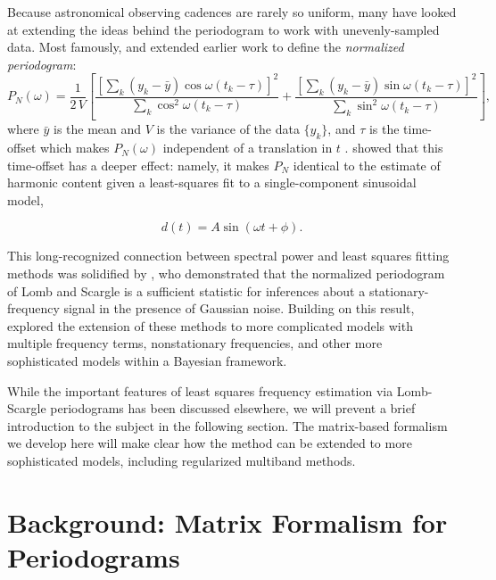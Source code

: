 \documentclass[12pt,preprint]{aastex}
\newcommand{\eqlabel}[1]{\label{eq:#1}}
\begin{document}
Because astronomical observing cadences are rarely so uniform, many have looked at extending the ideas behind the periodogram to work with unevenly-sampled data. Most famously, \citet{Lomb76} and \citet{Scargle82} extended earlier work to define the {\it normalized periodogram}:
\begin{equation}
  \eqlabel{LombScargle}
  P_N(\omega) = \frac{1}{2\,V}\left[
    \frac{\left[\sum_k(y_k - \bar{y})\cos\omega(t_k - \tau)\right]^2}
    {\sum_k \cos^2\omega(t_k - \tau)}
    +
    \frac{\left[\sum_k(y_k - \bar{y})\sin\omega(t_k - \tau)\right]^2}
    {\sum_k \sin^2\omega(t_k - \tau)}
\right],
\end{equation}
where $\bar{y}$ is the mean and $V$ is the variance of the data $\{y_k\}$, and $\tau$ is the time-offset which makes $P_N(\omega)$ independent of a translation in $t$ \citep[see][for an in-depth discussion]{NumRec}. \citet{Lomb76} showed that this time-offset has a deeper effect: namely, it makes $P_N$ identical to the estimate of harmonic content given a least-squares fit to a single-component sinusoidal model,

\begin{equation}
  \eqlabel{SingleModel}
  d(t) = A\sin(\omega t + \phi).
\end{equation}

This long-recognized connection between spectral power and least squares fitting methods was solidified by \citet{Jaynes87}, who demonstrated that the normalized periodogram of Lomb and Scargle is a sufficient statistic for inferences about a stationary-frequency signal in the presence of Gaussian noise. Building on this result, \citet{Bretthorst88} explored the extension of these methods to more complicated models with multiple frequency terms, nonstationary frequencies, and other more sophisticated models within a Bayesian framework.

While the important features of least squares frequency estimation via Lomb-Scargle periodograms has been discussed elsewhere, we will prevent a brief introduction to the subject in the following section.
The matrix-based formalism we develop here will make clear how the method can be extended to more sophisticated models, including regularized multiband methods.


\section{Background: Matrix Formalism for Periodograms}
\end{document}
